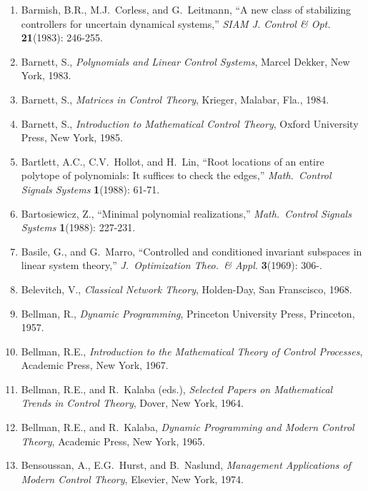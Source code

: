 \begin{enumerate}
\item
Barmish, B.R., M.J.\ Corless, and G.\ Leitmann, ``A new class of stabilizing
controllers for uncertain dynamical systems,'' {\it SIAM J.  Control \& Opt.}
{\bf 21}(1983): 246-255.

\item
Barnett, S., {\it Polynomials and Linear Control Systems}, Marcel Dekker, New
York, 1983.

\item
Barnett, S., {\it Matrices in Control Theory}, Krieger, Malabar, Fla., 1984.

\item
Barnett, S., {\it Introduction to Mathematical Control Theory}, Oxford
University Press, New York, 1985.

\item
Bartlett, A.C., C.V.\ Hollot, and H.\ Lin, ``Root locations of an entire
polytope of polynomials: It suffices to check the edges,'' {\it Math.\ Control
Signals Systems} {\bf 1}(1988): 61-71.

\item
Bartosiewicz, Z., ``Minimal polynomial realizations,'' {\it Math.\ Control
Signals Systems} {\bf 1}(1988): 227-231.

\item
Basile, G., and G.\ Marro, ``Controlled and conditioned invariant subspaces in
linear system theory,'' {\it J.\ Optimization Theo.\ \& Appl.} {\bf 3}(1969):
306-.

\item
Belevitch, V., {\it Classical Network Theory}, Holden-Day, San Franscisco,
1968.

\item
Bellman, R., {\it Dynamic Programming}, Princeton University Press, Princeton,
1957.

\item
Bellman, R.E., {\it Introduction to the Mathematical Theory of Control
Processes}, Academic Press, New York, 1967.

\item
Bellman, R.E., and R.\ Kalaba (eds.), {\it Selected Papers on Mathematical
Trends in Control Theory}, Dover, New York, 1964.

\item
Bellman, R.E., and R.\ Kalaba, {\it Dynamic Programming and Modern Control
Theory}, Academic Press, New York, 1965.

\item
Bensoussan, A., E.G.\ Hurst, and B.\ Naslund, {\it Management Applications of
Modern Control Theory}, Elsevier, New York, 1974.


\end{enumerate}
